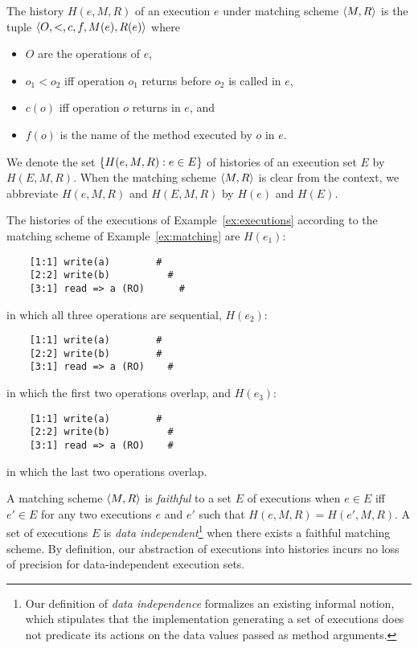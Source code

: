 The history $H(e,M,R)$ of an execution $e$ under matching scheme ${\left\langle{M,R}\right\rangle}$ is
the tuple ${\left\langle{O,<,c,f,M(e),R(e)}\right\rangle}$ where
\begin{itemize}

  \item $O$ are the operations of $e$,

  \item $o_1 < o_2$ if{f} operation $o_1$ returns before $o_2$ is called in $e$,

  \item $c(o)$ if{f} operation $o$ returns in $e$, and

  \item $f(o)$ is the name of the method executed by $o$ in $e$.

\end{itemize}
We denote the set ${\{{H(e,M,R) : e \in E}\}}$ of histories of an execution set
$E$ by $H(E,M,R)$. When the matching scheme ${\left\langle{M,R}\right\rangle}$ is clear from the
context, we abbreviate $H(e,M,R)$ and $H(E,M,R)$ by $H(e)$ and $H(E)$.

\begin{example}
  \label{ex:histories-of-executions}

  The histories of the executions of Example~\ref{ex:executions} according to
  the matching scheme of Example~\ref{ex:matching} are $H(e_1)$:
\begin{verbatim}
    [1:1] write(a)        #
    [2:2] write(b)          #
    [3:1] read => a (RO)      #
\end{verbatim}
  in which all three operations are sequential, $H(e_2)$:
\begin{verbatim}
    [1:1] write(a)        #
    [2:2] write(b)        #
    [3:1] read => a (RO)    #
\end{verbatim}
  in which the first two operations overlap, and $H(e_3)$:
\begin{verbatim}
    [1:1] write(a)        #
    [2:2] write(b)          #
    [3:1] read => a (RO)    #
\end{verbatim}
  in which the last two operations overlap.

\end{example}

A matching scheme ${\left\langle{M,R}\right\rangle}$ is \emph{faithful} to a set $E$ of executions
when $e \in E$ if{f} $e' \in E$ for any two executions $e$ and $e'$ such that
$H(e,M,R) = H(e',M,R)$. A set of executions $E$ is \emph{data
independent}\footnote{Our definition of \emph{data independence} formalizes an
existing informal notion, which stipulates that the implementation generating a
set of executions does not predicate its actions on the data values passed as
method arguments.} when there exists a faithful matching scheme. By definition,
our abstraction of executions into histories incurs no loss of precision for
data-independent execution sets.

